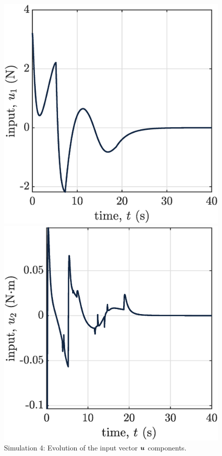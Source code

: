 \begin{figure}[!ht]
    \begin{minipage}[t]{.45\textwidth}
        \centering
        \includegraphics[width=\textwidth]{figures/sim4u1.eps}
    \end{minipage}
    \hfill
    \begin{minipage}[t]{.45\textwidth}
        \centering
        \includegraphics[width=\textwidth]{figures/sim4u2.eps}
    \end{minipage}  
    \caption{\label{fig:sim4u}Simulation 4: Evolution of the input vector $\boldsymbol{u}$ components.}
\end{figure}
